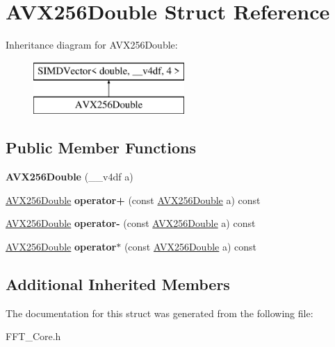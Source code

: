 \hypertarget{struct_a_v_x256_double}{}\section{A\+V\+X256\+Double Struct Reference}
\label{struct_a_v_x256_double}
Inheritance diagram for A\+V\+X256\+Double\+:\begin{figure}[H]
\begin{center}
\leavevmode
\includegraphics[height=2.000000cm]{struct_a_v_x256_double}
\end{center}
\end{figure}
\subsection*{Public Member Functions}
\begin{DoxyCompactItemize}
\item 
\mbox{\label{struct_a_v_x256_double_a4abc089b2993ff2251c19b9258aa5fb1}} 
{\bfseries A\+V\+X256\+Double} (\+\_\+\+\_\+v4df a)
\item 
\mbox{\label{struct_a_v_x256_double_af85cd787e05b253c8b857f9662e9c56c}} 
\hyperlink{struct_a_v_x256_double}{A\+V\+X256\+Double} {\bfseries operator+} (const \hyperlink{struct_a_v_x256_double}{A\+V\+X256\+Double} a) const
\item 
\mbox{\label{struct_a_v_x256_double_aa6ec9c1aff6e40c0ecb5d8ed92ed9436}} 
\hyperlink{struct_a_v_x256_double}{A\+V\+X256\+Double} {\bfseries operator-\/} (const \hyperlink{struct_a_v_x256_double}{A\+V\+X256\+Double} a) const
\item 
\mbox{\label{struct_a_v_x256_double_a611610564701ac783881596dc9a05f14}} 
\hyperlink{struct_a_v_x256_double}{A\+V\+X256\+Double} {\bfseries operator$\ast$} (const \hyperlink{struct_a_v_x256_double}{A\+V\+X256\+Double} a) const
\end{DoxyCompactItemize}
\subsection*{Additional Inherited Members}


The documentation for this struct was generated from the following file\+:\begin{DoxyCompactItemize}
\item 
F\+F\+T\+\_\+\+Core.\+h\end{DoxyCompactItemize}
